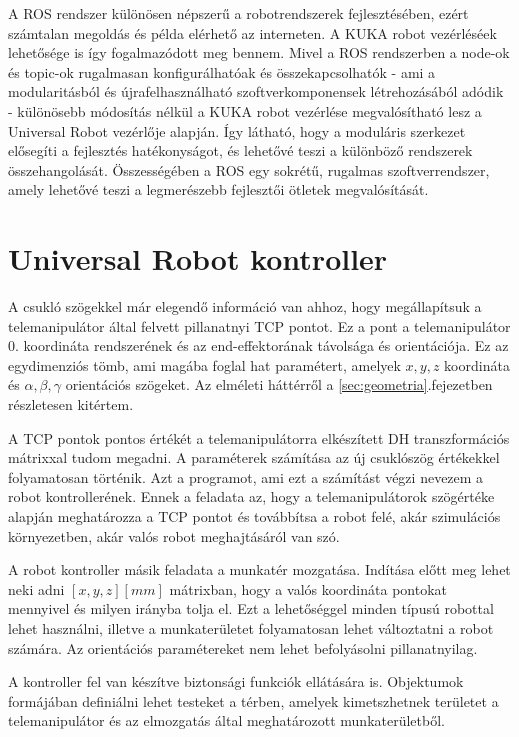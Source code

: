 A ROS rendszer különösen népszerű a robotrendszerek fejlesztésében, ezért számtalan megoldás és példa elérhető az interneten. A KUKA robot vezérléséek lehetősége is így fogalmazódott meg bennem. Mivel a ROS rendszerben a node-ok és topic-ok rugalmasan konfigurálhatóak és összekapcsolhatók - ami a modularitásból és újrafelhasználható szoftverkomponensek létrehozásából adódik - különösebb módosítás nélkül a KUKA robot vezérlése megvalósítható lesz a Universal Robot vezérlője alapján. Így látható, hogy a moduláris szerkezet elősegíti a fejlesztés hatékonyságot, és lehetővé teszi a különböző rendszerek összehangolását. Összességében a ROS egy sokrétű, rugalmas szoftverrendszer, amely lehetővé teszi a legmerészebb fejlesztői ötletek megvalósítását.


\section{Universal Robot kontroller}

A csukló szögekkel már elegendő információ van ahhoz, hogy megállapítsuk a telemanipulátor által felvett pillanatnyi TCP pontot. Ez a pont a telemanipulátor 0. koordináta rendszerének és az end-effektorának távolsága és orientációja. Ez az egydimenziós tömb, ami magába foglal hat paramétert, amelyek $x,y,z$ koordináta és $\alpha,\beta,\gamma$ orientációs szögeket. Az elméleti háttérről a \ref{sec:geometria}.fejezetben részletesen kitértem.

A TCP pontok pontos értékét a telemanipulátorra elkészített DH transzformációs mátrixxal tudom megadni. A paraméterek számítása az új csuklószög értékekkel folyamatosan történik. Azt a programot, ami ezt a számítást végzi nevezem a robot kontrollerének. Ennek a feladata az, hogy a telemanipulátorok szögértéke alapján meghatározza a TCP pontot és továbbítsa a robot felé, akár szimulációs környezetben, akár valós robot meghajtásáról van szó.

A robot kontroller másik feladata a munkatér mozgatása. Indítása előtt meg lehet neki adni $[x,y,z] [mm]$ mátrixban, hogy a valós koordináta pontokat mennyivel és milyen irányba tolja el. Ezt a lehetőséggel minden típusú robottal lehet használni, illetve a munkaterületet folyamatosan lehet változtatni a robot számára. Az orientációs paramétereket nem lehet befolyásolni pillanatnyilag.

A kontroller fel van készítve biztonsági funkciók ellátására is. Objektumok formájában definiálni lehet testeket a térben, amelyek kimetszhetnek területet a telemanipulátor és az elmozgatás által meghatározott munkaterületből.

